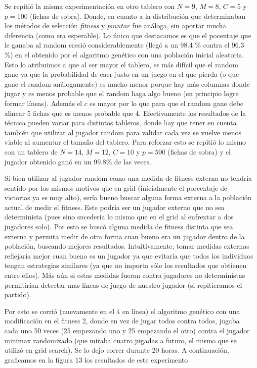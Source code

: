 \documentclass[A4paper,oneside,fleqn,11pt]{article}
\theoremstyle{definition}
\begin{document}
Se repitió la misma experimentación en otro tablero con $N=9$, $M=8$, $C=5$ y $p=100$ (fichas de sobra). Donde, en cuanto a la distribución que determinaban los métodos de selección \textit{fitness} y $pmutar$ fue análoga, sin aportar mucha diferencia (como era esperable). Lo único que destacamos es que el pocentaje que le ganaba al random creció considerablemente (llegó a un 98.4 \% contra el 96.3 \%) en el obtenido por el algoritmo genético con una población inicial aleatoria. Esto lo atribuimos a que al ser mayor el tablero, es más difícil que el random gane ya que la probabilidad de caer justo en un juego en el que pierda (o que gane el random análogamente) es mucho menor porque hay más columnas donde jugar y es menos probable que el random haga algo bueno (en principio logre formar líneas). Además el $c$ es mayor por lo que para que el random gane debe alinear 5 fichas que es menos probable que 4. Efectivamente los resultados de la técnica pueden variar para distintos tableros, donde hay que tener en cuenta también que utilizar al jugador random para validar cada vez se vuelve menos viable al aumentar el tamaño del tablero. Para reforzar esto se repitió lo mismo con un tablero de $N=14$, $M=12$, $C=10$ y $p=500$ (fichas de sobra) y el jugador obtenido ganó en un 99.8\% de las veces.


Si bien utilizar al jugador random como una medida de fitness externa no tendría sentido por los mismos motivos que en grid (inicialmente el porcentaje de victorias ya es muy alto), sería bueno buscar alguna forma externa a la población actual de medir el fitness. Este podría ser un jugador externo que no sea determinista (pues sino sucederia lo mismo que en el grid al enfrentar a dos jugadores solo). Por esto se buscó alguna medida de fitness distinta que sea externa y permita medir de otra forma cuan bueno era un jugador dentro de la población, buscando mejores resultados. Intuitivamente, tomar medidas externas reflejaría mejor cuan bueno es un jugador ya que evitaría que todos los individuos tengan estrategias similares (ya que no importa sólo los resultados que obtienen entre ellos). Más aún si estas medidas fueran contra jugadores no deterministas permitirían detectar mas líneas de juego de nuestro jugador (si repitieramos el partido). 

Por esto se corrió (nuevamente en el 4 en línea) el algoritmo genético con una modificación en el fitness 2, donde en vez de jugar todos contra todos, jugaba cada uno 50 veces (25 empezando uno y 25 empezando el otro) contra el jugador minimax randomizado (que miraba cuatro jugadas a futuro, el mismo que se utilizó en grid search). Se lo dejo correr durante 20 horas. A continuación, graficamos en la figura 13 los resultados de este experimento
\end{document}
